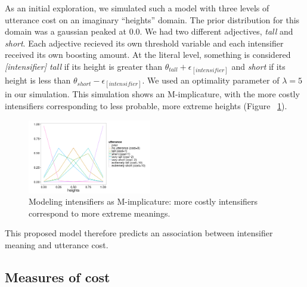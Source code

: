 \documentclass[10pt,letterpaper]{article}
\newcommand{\w}[1]{\emph{#1}}
\begin{document}
As an initial exploration, we simulated such a model with three levels of utterance cost on an imaginary ``heights'' domain. The prior distribution for this domain was a gaussian peaked at 0.0.
We had two different adjectives, \w{tall} and \w{short}. Each adjective recieved its own threshold variable and each intensifier received its own boosting amount. At the literal level, something is considered \w{[intensifier] tall} if its height is greater than $\theta_{tall} + \epsilon_{[intensifier]}$ and \w{short} if its height is less than $\theta_{short} - \epsilon_{[intensifier]}$.  We used an optimality parameter of $\lambda=5$ in our simulation. This simulation shows an M-implicature, with the more costly intensifiers corresponding to less probable, more extreme heights (Figure ~\ref{model}).


\begin{figure}[ht]
\begin{center}
\includegraphics[width=0.48\textwidth]{analysis_files_for_writeup/images/model_results.png}
\end{center}
\caption{Modeling intensifiers as M-implicature: more costly intensifiers correspond to more extreme meanings.} 
\label{model}
\end{figure}

This proposed model therefore predicts an association between intensifier meaning and utterance cost.

\subsection{Measures of cost}
\end{document}

